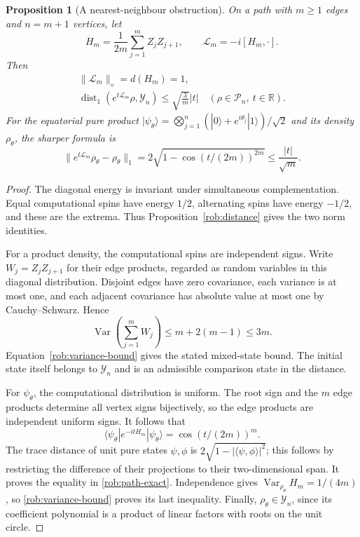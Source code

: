 \documentclass[reqno]{amsart}
\newtheorem{proposition}[theorem]{Proposition}
\theoremstyle{definition}
\theoremstyle{remark}
\newcommand{\R}{\mathbb R}
\begin{document}
\begin{proposition}[A nearest-neighbour obstruction]
\label{rob:path}
On a path with $m\geq1$ edges and $n=m+1$ vertices, let
\[
 H_m=\frac1{2m}\sum_{j=1}^m Z_jZ_{j+1},
 \qquad \mathcal L_m=-i[H_m,\cdot].
\]
Then
\begin{gather*}
 \|\mathcal L_m\|_\diamond=d(H_m)=1,\\
 \operatorname{dist}_1(e^{t\mathcal L_m}\rho,\mathcal Y_n)
 \leq\sqrt{\frac3m}|t|
 \quad(\rho\in\mathcal P_n,\ t\in\R).
\end{gather*}
For the equatorial pure product
$|\psi_\theta\rangle=\bigotimes_{j=1}^n
(|0\rangle+e^{i\theta_j}|1\rangle)/\sqrt2$ and its density
$\rho_\theta$, the sharper formula is
\begin{equation}
 \|e^{t\mathcal L_m}\rho_\theta-\rho_\theta\|_1
 =2\sqrt{1-\cos(t/(2m))^{2m}}
 \leq\frac{|t|}{\sqrt m}.
 \label{rob:path-exact}
\end{equation}
\end{proposition}

\begin{proof}
The diagonal energy is invariant under simultaneous complementation.
Equal computational spins have energy $1/2$, alternating spins have
energy $-1/2$, and these are the extrema.  Thus
Proposition~\ref{rob:distance} gives the two norm identities.

For a product density, the computational spins are independent signs.
Write $W_j=Z_jZ_{j+1}$ for their edge products, regarded as random
variables in this diagonal distribution.  Disjoint edges have zero
covariance, each variance is at most one, and each adjacent covariance
has absolute value at most one by Cauchy--Schwarz.  Hence
\[
 \operatorname{Var}\left(\sum_{j=1}^m W_j\right)
 \leq m+2(m-1)\leq3m.
\]
Equation~\eqref{rob:variance-bound} gives the stated mixed-state bound.
The initial state itself belongs to $\mathcal Y_n$ and is an
admissible comparison state in the distance.

For $\psi_\theta$, the computational distribution is uniform.
The root sign and the $m$ edge products determine all vertex signs
bijectively, so the edge products are independent uniform signs.
It follows that
\[
 \langle\psi_\theta|e^{-itH_m}|\psi_\theta\rangle
 =\cos(t/(2m))^m.
\]
The trace distance of unit pure states $\psi,\phi$ is
$2\sqrt{1-|\langle\psi,\phi\rangle|^2}$; this follows by restricting
the difference of their projections to their two-dimensional span.
It proves the equality in \eqref{rob:path-exact}.
Independence gives $\operatorname{Var}_{\rho_\theta}H_m=1/(4m)$,
so \eqref{rob:variance-bound} proves its last inequality.
Finally, $\rho_\theta\in\mathcal Y_n$, since its coefficient polynomial
is a product of linear factors with roots on the unit circle.
\end{proof}
\end{document}
